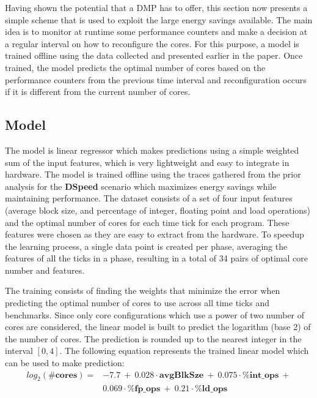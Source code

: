 Having shown the potential that a DMP has to offer, this section now presents a simple scheme that is used to exploit the large energy savings available.
The main idea is to monitor at runtime some performance counters and make a decision at a regular interval on how to reconfigure the cores.
For this purpose, a model is trained offline using the data collected and presented earlier in the paper.
Once trained, the model predicts the optimal number of cores based on the performance counters from the previous time interval and reconfiguration occurs if it is different from the current number of cores.

\vspace{10mm}
\subsection{Model}

The model is linear regressor which makes predictions using a simple weighted sum of the input features, which is very lightweight and easy to integrate in hardware.
The model is trained offline using the traces gathered from the prior analysis for the \textbf{DSpeed} scenario which maximizes energy savings while maintaining performance.
The dataset consists of a set of four input features (average block size, and percentage of integer, floating point and load operations) and the optimal number of cores for each time tick for each program.
These features were chosen as they are easy to extract from the hardware.
To speedup the learning process, a single data point is created per phase, averaging the features of all the ticks in a phase, resulting in a total of 34 pairs of optimal core number and features.

The training consists of finding the weights that minimize the error when predicting the optimal number of cores to use across all time ticks and benchmarks.
Since only core configurations which use a power of two number of cores are considered, the linear model is built to predict the logarithm (base 2) of the number of cores.
The prediction is rounded up to the nearest integer in the interval $[0,4]$.
The following equation represents the trained linear model which can be used to make prediction:
\vspace{-1mm}
\begin{align*}
  log_2(\textbf{\#cores}) = & -7.7\ +\ 0.028 \cdot \textbf{avgBlkSze}\ +\ 0.075 \cdot \textbf{\%int\_ops}\ +\\
 &0.069 \cdot \textbf{\%fp\_ops}\ +\ 0.21 \cdot \textbf{\%ld\_ops}
\end{align*}

